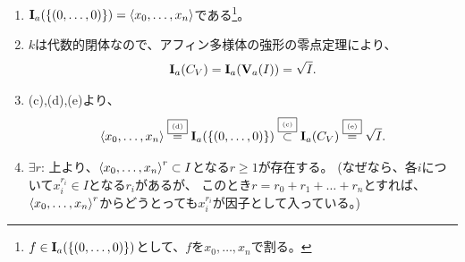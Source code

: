\begin{myproof}
\begin{enumerate}
\begin{enumerate}
      \item
      $\textbf I_a(\left\{(0,\dots,0)\right\}) = \left\langle x_0,\dots,x_n \right\rangle$である\footnote{$f\in \textbf I_a(\left\{(0,\dots,0)\right\})$として、$f$を$x_0,\dots,x_n$で割る。}。
      \item
      $k$は代数的閉体なので、アフィン多様体の強形の零点定理により、
      \begin{align}
        \textbf I_a(C_V) = \textbf I_a(\textbf V_a(I)) = \sqrt{I}.
      \end{align}
      \item
      (c),(d),(e)より、
      \begin{align}
        \left\langle x_0,\dots,x_n \right\rangle
        \overset{\text{\fbox{\tiny (d)}}}{=}
        \textbf I_a(\left\{(0,\dots,0)\right\})
        \overset{\text{\fbox{\tiny (c)}}}{\subset}
        \textbf I_a(C_V)
        \overset{\text{\fbox{\tiny (e)}}}{=}
        \sqrt{I}.
      \end{align}
      \item
      $\exists r$: 上より、$\left\langle x_0,\dots,x_n \right\rangle^r \subset I$となる$r\ge 1$が存在する。
      (なぜなら、各$i$について$x_i^{r_i} \in I$となる$r_i$があるが、
      このとき$r=r_0+r_1 + \dots +r_n$とすれば、$\left\langle x_0,\dots,x_n \right\rangle^r$からどうとっても$x_i^{r_i}$が因子として入っている。)
    \end{enumerate}
  \end{enumerate}
\end{myproof}

